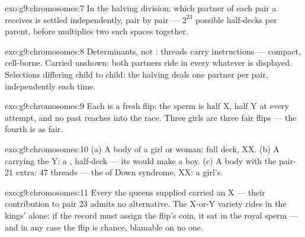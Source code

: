\begin{solution}{exo:g9:chromosomes:7}
In the halving division: which partner of each pair a
 receives is settled independently, pair by pair ---
$2^{23}$ possible half-decks per parent, before
 multiplies two such spaces together.
\end{solution}

\begin{solution}{exo:g9:chromosomes:8}
Determinants, not : threads carry instructions ---
compact, cell-borne. Carried unshown: both partners ride
in every  whatever is displayed. Selections differing
child to child: the halving deals one partner per pair,
independently each time.
\end{solution}

\begin{solution}{exo:g9:chromosomes:9}
Each  is a fresh flip: the sperm 
is half X, half Y at every attempt, and no past 
reaches into the race. Three girls are three fair flips
--- the fourth is as fair.
\end{solution}

\begin{solution}{exo:g9:chromosomes:10}
(a) A body  of a girl or woman: full deck, XX. (b) A
 carrying the Y: a , half-deck --- its
 would make a boy. (c) A body  with the
pair-21 extra: 47 threads --- the  of Down
syndrome, XX: a girl's.
\end{solution}

\begin{solution}{exo:g9:chromosomes:11}
Every  the queens supplied carried an X --- their
contribution to pair 23 admits no alternative. The X-or-Y
variety rides in the kings'  alone: if the record
must assign the flip's coin, it sat in the royal sperm ---
and in any case the flip is chance, blamable on no one.
\end{solution}

